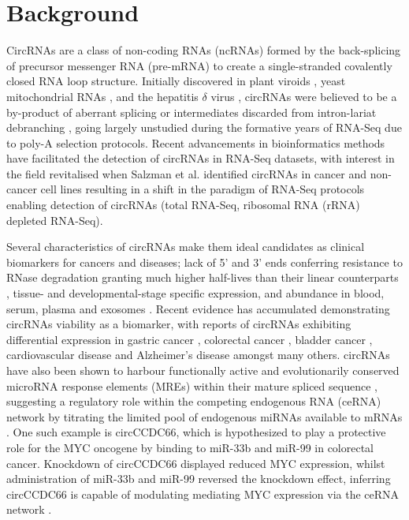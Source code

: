 \documentclass{bmcart}
\begin{document}
\section*{Background}
CircRNAs are a class of non-coding RNAs (ncRNAs) formed by the back-splicing of precursor messenger RNA (pre-mRNA) to create a single-stranded covalently closed RNA loop structure. Initially discovered in plant viroids \cite{Sanger1976}, yeast mitochondrial RNAs \cite{ARNBERG1980}, and the hepatitis $\delta$ virus \cite{Kos1986}, circRNAs were believed to be a by-product of aberrant splicing or intermediates discarded from intron-lariat debranching \cite{Cocquerelle1993, Qian1992}, going largely unstudied during the formative years of RNA-Seq due to poly-A selection protocols. Recent advancements in bioinformatics methods have facilitated the detection of circRNAs in RNA-Seq datasets, with interest in the field revitalised when Salzman et al. identified circRNAs in cancer and non-cancer cell lines \cite{Salzman2012} resulting in a shift in the paradigm of RNA-Seq protocols enabling detection of circRNAs (total RNA-Seq, ribosomal RNA (rRNA) depleted RNA-Seq). \par
Several characteristics of circRNAs make them ideal candidates as clinical biomarkers for cancers and diseases; lack of 5’ and 3’ ends conferring resistance to RNase degradation granting much higher half-lives than their linear counterparts \cite{Salzman2012, Memczak2013}, tissue- and developmental-stage specific expression, and abundance in blood, serum, plasma and exosomes \cite{Memczak2015, Bahn2015}. Recent evidence has accumulated demonstrating circRNAs viability as a biomarker, with reports of circRNAs exhibiting differential expression in gastric cancer \cite{Li2015Apr}, colorectal cancer \cite{Bachmayr-Heyda2015}, bladder cancer \cite{Zhong2016}, cardiovascular disease \cite{Tan2016} and Alzheimer's disease \cite{Panda2017} amongst many others. circRNAs have also been shown to harbour functionally active and evolutionarily conserved microRNA response elements (MREs) within their mature spliced sequence \cite{Hansen2013, Thomas2014}, suggesting a regulatory role within the competing endogenous RNA (ceRNA) network by titrating the limited pool of endogenous miRNAs available to mRNAs \cite{DENZLER2014}. One such example is circCCDC66, which is hypothesized to play a protective role for the MYC oncogene by binding to miR-33b and miR-99 in colorectal cancer. Knockdown of circCCDC66 displayed reduced MYC expression, whilst administration of miR-33b and miR-99 reversed the knockdown effect, inferring circCCDC66 is capable of modulating mediating MYC expression via the ceRNA network \cite{Hsiao2017May}.
\end{document}
